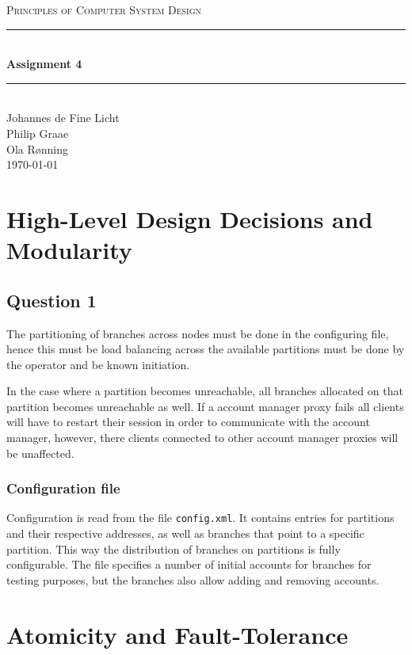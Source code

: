 \documentclass[12pt]{article}
\newcommand{\HRule}{\rule{\linewidth}{0.5mm}}
\begin{document}
\begin{center}
\textsc{\LARGE Principles of Computer System Design}\\[0.3cm] %
\HRule \\[0.4cm]
{ \huge \bfseries Assignment 4}
\HRule \\[0.4cm]
\large
Johannes de Fine Licht
\\Philip Graae
\\Ola Rønning
\\\today
\end{center}

\section*{High-Level Design Decisions and Modularity}

\subsection*{Question 1}
The partitioning of branches across nodes must be done in the configuring file, hence this must be load balancing across the available partitions must be done by the operator and be known initiation.

In the case where a partition becomes unreachable, all branches allocated on that partition becomes unreachable as well. If a account manager proxy fails all clients will have to restart their session in order to communicate with the account manager, however, there clients connected to other account manager proxies will be unaffected.

\subsubsection*{Configuration file}
Configuration is read from the file \texttt{config.xml}. It contains entries for partitions and their respective addresses, as well as branches that point to a specific partition. This way the distribution of branches on partitions is fully configurable. The file specifies a number of initial accounts for branches for testing purposes, but the branches also allow adding and removing accounts.

\section*{Atomicity and Fault-Tolerance}
\end{document}
